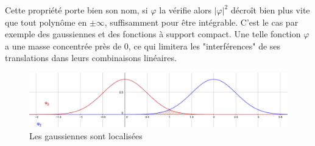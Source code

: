 	Cette propriété porte bien son nom, si $\varphi$ la vérifie alors $|\varphi|^2$ décroît bien plus vite que tout polynôme en $\pm \infty$, suffisamment pour être intégrable. C'est le cas par exemple des gaussiennes et des fonctions à support compact. Une telle fonction $\varphi$ a une masse concentrée près de 0, ce qui limitera les "interférences" de ses translations dans leurs combinaisons linéaires.
	
	\begin{figure}[h]
		\centering
		\includegraphics[width=450pt]{Pierre/Localized.png}
		\caption{Les gaussiennes sont localisées}
	\end{figure}
	
%		
%		
%		
%		
%		
%		
		
